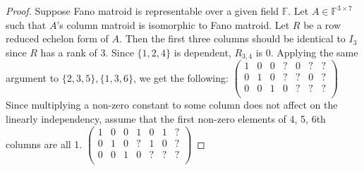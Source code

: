 \begin{proof}
Suppose Fano matroid is representable over a given field $\mathbb{F}$.
Let $A \in \mathbb{F}^{3 \times 7}$ such that $A$'s column matroid is isomorphic to Fano matroid.
Let $R$ be a row reduced echelon form of $A$.
Then the first three columns should be identical to $I_3$ since $R$ has a rank of 3.
Since $\{1, 2, 4\}$ is dependent, $R_{3, 4}$ is 0.
Applying the same argument to $\{2, 3, 5\}, \{1, 3, 6\}$, we get the following:
$\begin{pmatrix}
1 & 0 & 0 & ? & 0 & ? & ? \\
0 & 1 & 0 & ? & ? & 0 & ? \\
0 & 0 & 1 & 0 & ? & ? & ? \\
\end{pmatrix}$
Since multiplying a non-zero constant to some column does not affect on the linearly independency, assume that the first non-zero elements of 4, 5, 6th columns are all 1.
$\begin{pmatrix}
1 & 0 & 0 & 1 & 0 & 1 & ? \\
0 & 1 & 0 & ? & 1 & 0 & ? \\
0 & 0 & 1 & 0 & ? & ? & ? \\
\end{pmatrix}$


\end{proof}
